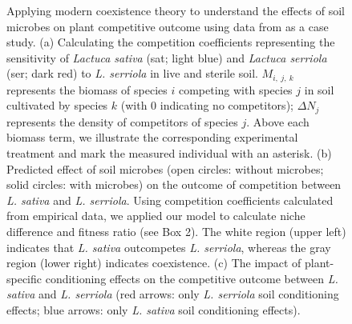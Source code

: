 \clearpage
\begin{figure}[h!]
	\centering
	\caption[Applying modern coexistence theory to understand the effects of soil microbes on plant competitive outcome using data from \citet{Aguilera2017}as a case study.]
		{\hspace{1mm}Applying modern coexistence theory to understand the effects of soil microbes on plant competitive outcome using data from \citet{Aguilera2017} as a case study.
		(a) Calculating the competition coefficients representing the sensitivity of \textit{Lactuca sativa} (sat; light blue) and \textit{Lactuca serriola} (ser; dark red) to \textit{L. serriola} in live and sterile soil. $M_{i,\ j,\ k}$ represents the biomass of species $i$ competing with species $j$ in soil cultivated by species $k$  (with $0$ indicating no competitors); $\Delta N_j$ represents the density of competitors of species $j$. Above each biomass term, we illustrate the corresponding experimental treatment and mark the measured individual with an asterisk.
		(b) Predicted effect of soil microbes (open circles: without microbes; solid circles: with microbes) on the outcome of competition between \textit{L. sativa} and \textit{L. serriola}. Using competition coefficients calculated from empirical data, we applied our model to calculate niche difference and fitness ratio (see Box 2). The white region (upper left) indicates that \textit{L. sativa} outcompetes \textit{L. serriola}, whereas the gray region (lower right) indicates coexistence.
		(c) The impact of plant-specific conditioning effects on the competitive outcome between \textit{L. sativa} and \textit{L. serriola} (red arrows: only \textit{L. serriola} soil conditioning effects; blue arrows: only \textit{L. sativa} soil conditioning effects). }
	\label{fig:Aguilera2017Data}
\end{figure}



